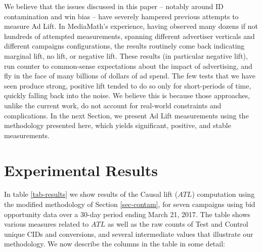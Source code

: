 \documentclass[11pt,a4paper]{article}
\theoremstyle{definition}
\theoremstyle{remark}
\theoremstyle{definition}
\theoremstyle{definition}
\theoremstyle{definition}
\theoremstyle{definition}
\theoremstyle{definition}
\theoremstyle{definition}
\begin{document}
We believe that the issues discussed in this paper -- notably around ID contamination and win bias -- have severely hampered previous attempts to measure Ad Lift. In MediaMath's experience, having observed many dozens if not hundreds of attempted measurements, spanning different advertiser verticals and different campaigns configurations, the results routinely come back indicating marginal lift, no lift, or negative lift. These results (in particular negative lift), run counter to common-sense expectations about the impact of advertising, and fly in the face of many billions of dollars of ad spend. The few tests that we have seen produce strong, positive lift tended to do so only for short-periods of time, quickly falling back into the noise. We believe this is because those approaches, unlike the current work, do not account for real-world constraints and complications. In the next Section, we present Ad Lift measurements using the methodology presented here, which yields significant, positive, and stable measurements.


\section{Experimental Results} \label{sec-results}

In table \ref{tab-results} we show results of the Causal lift ($ATL$) computation using the modified methodology of Section \ref{sec-contam}, for seven campaigns using bid opportunity data over a 30-day period ending March 21, 2017. 
The table shows various measures related to $ATL$ as well as the raw counts of Test and Control unique CIDs and conversions, and several intermediate values that illustrate our methodology. 
We now describe the columns in the table in some detail:
\end{document}
